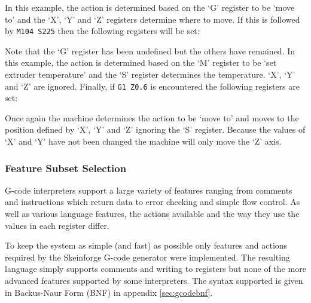 				In this example, the action is determined based on the `G' register to
				be `move to' and the `X', `Y' and `Z' registers determine where to move.
				If this is followed by \verb|M104 S225| then the following registers
				will be set:
				
				\begin{gcoderegs}
				\end{gcoderegs}
				
				Note that the `G' register has been undefined but the others have
				remained. In this example, the action is determined based on the `M'
				register to be `set extruder temperature' and the `S' register
				determines the temperature. `X', `Y' and `Z' are ignored. Finally, if
				\verb|G1 Z0.6| is encountered the following registers are set:
				
				\begin{gcoderegs}
					\reg{G}{1}
					\reg{S}{225}
					\reg{X}{10}
					\reg{Y}{-15}
					\reg{Z}{0.6}
				\end{gcoderegs}
				
				Once again the machine determines the action to be `move to' and moves
				to the position defined by `X', `Y' and `Z' ignoring the `S' register.
				Because the values of `X' and `Y' have not been changed the machine will
				only move the `Z' axis.
			
			\subsubsection{Feature Subset Selection}
				
				G-code interpreters support a large variety of features ranging from
				comments and instructions which return data to error checking and simple
				flow control. As well as various language features, the actions
				available and the way they use the values in each register differ.
				
				To keep the system as simple (and fast) as possible only features and
				actions required by the Skeinforge G-code generator were implemented.
				The resulting language simply supports comments and writing to registers
				but none of the more advanced features supported by some interpreters.
				The syntax supported is given in Backus-Naur Form (BNF) in appendix
				\ref{sec:gcodebnf}.
				
